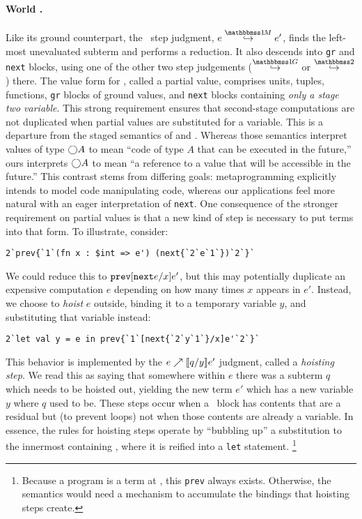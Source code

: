 \begin{abstrsyn}
\paragraph{World \bbonem.}
Like its ground counterpart, the \bbonem\ step judgment, $\stepmix e {e'}$, finds the left-most unevaluated subterm and performs a reduction.
It also descends into {\tt gr} and {\tt next} blocks, 
using one of the other two step judgements ($\stepsym \bbonep$ or $\stepsym \bbtwo$) there. 
The value form for \bbonem, called a partial value, comprises units, tuples, functions, {\tt gr} blocks of ground values, and {\tt next} blocks containing \emph{only a stage two variable}.
This strong requirement ensures that second-stage computations are not duplicated 
when partial values are substituted for a variable.
This is a departure from the staged semantics of \cite{taha-thesis-99} and \cite{davies96}.
Whereas those semantics interpret values of type $\bigcirc A$ to mean ``code of type $A$ that can be executed in the future,''
ours interprets $\bigcirc A$ to mean ``a reference to a value that will be accessible in the future.''
This contrast stems from differing goals: metaprogramming explicitly intends to model code manipulating code,
whereas our applications feel more natural with an eager interpretation of {\tt next}.
One consequence of the stronger requirement on partial values is that a new kind of step is necessary to put terms into that form.
To illustrate, consider:
\begin{lstlisting}
2`prev{`1`(fn x : $int => e') (next{`2`e`1`})`2`}`
\end{lstlisting}
We could reduce this to ${\tt prev}{[{\tt next} e/x]e'}$, but this may potentially duplicate an
expensive computation $e$ depending on how many times $x$ appears in $e'$. 
Instead, we choose to \emph{hoist} $e$ outside, binding it
to a temporary variable $y$, and substituting that variable instead:
\begin{lstlisting} 
2`let val y = e in prev{`1`[next{`2`y`1`}/x]e'`2`}`
\end{lstlisting}\end{abstrsyn}
This behavior is implemented by the ${e}\nearrow \llbracket q/y \rrbracket{e'}$ judgment, called a \emph{hoisting step}.
We read this as saying that somewhere within $e$ there was a subterm $q$ which needs to be hoisted out,
yielding the new term $e'$ which has a new variable $y$ where $q$ used to be.
These steps occur when a \next\ block has contents that are a residual but (to prevent loops) not when those contents are already a variable.
In essence, the rules for hoisting steps operate by ``bubbling up'' a substitution to the innermost containing \prev,
where it is reified into a {\tt let} statement.
\footnote{Because a program is a term at \bbtwo, this {\tt prev} always exists.
Otherwise, the semantics would need a mechanism to accumulate the bindings that hoisting steps create.}

